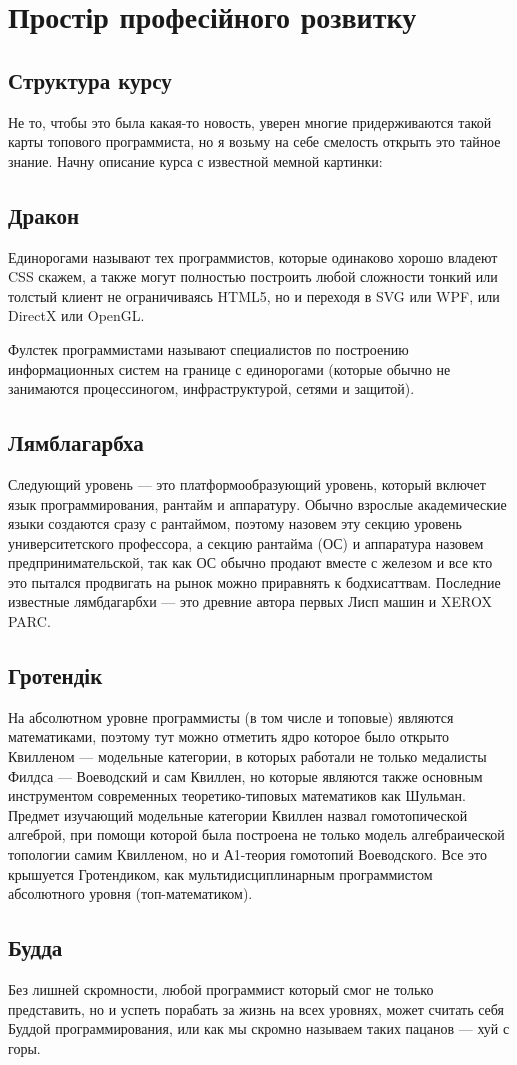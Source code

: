 \section{Простір професійного розвитку}

\subsection{Структура курсу}

Не то, чтобы это была какая-то новость, уверен многие придерживаются такой карты топового программиста, но я возьму на себе смелость открыть это тайное знание. Начну описание курса с известной мемной картинки:

\subsection{Дракон}

Единорогами называют тех программистов, которые одинаково хорошо владеют CSS скажем, а также могут полностью построить любой сложности тонкий или толстый клиент не ограничиваясь HTML5, но и переходя в SVG или WPF, или DirectX или OpenGL.

Фулстек программистами называют специалистов по построению информационных систем на границе с единорогами (которые обычно не занимаются процессиногом, инфраструктурой, сетями и защитой).

\subsection{Лямблагарбха}

Следующий уровень — это платформообразующий уровень, который включет язык программирования, рантайм и аппаратуру. Обычно взрослые академические языки создаются сразу с рантаймом, поэтому назовем эту секцию уровень университетского профессора, а секцию рантайма (ОС) и аппаратура назовем предпринимательской, так как ОС обычно продают вместе с железом и все кто это пытался продвигать на рынок можно приравнять к бодхисаттвам. Последние известные лямбдагарбхи — это древние автора первых Лисп машин и XEROX PARC.

\subsection{Гротендік}

На абсолютном уровне программисты (в том числе и топовые) являются математиками, поэтому тут можно отметить ядро которое было открыто Квилленом — модельные категории, в которых работали не только медалисты Филдса — Воеводский и сам Квиллен, но которые являются также основным инструментом современных теоретико-типовых математиков как Шульман. Предмет изучающий модельные категории Квиллен назвал гомотопической алгеброй, при помощи которой была построена не только модель алгебраической топологии самим Квилленом, но и А1-теория гомотопий Воеводского. Все это крышуется Гротендиком, как мультидисциплинарным программистом абсолютного уровня (топ-математиком).

\subsection{Будда}

Без лишней скромности, любой программист который смог не только представить, но и успеть порабать за жизнь на всех уровнях, может считать себя Буддой программирования, или как мы скромно называем таких пацанов — хуй с горы.

\normalsize
